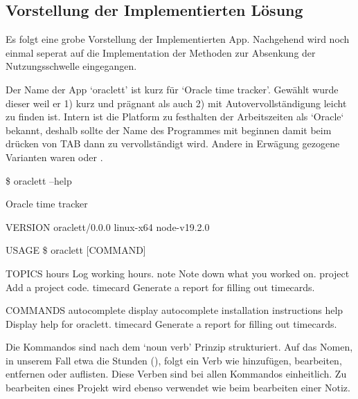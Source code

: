 \documentclass[oneside,bibliography=totocnumbered,BCOR=5mm]{scrbook}
\newenvironment{code}{\captionsetup{type=listing, skip=0pt}}{}
\begin{document}
\subsection{Vorstellung der Implementierten Lösung}


Es folgt eine grobe Vorstellung der Implementierten App. Nachgehend wird
noch einmal seperat auf die Implementation der Methoden zur Absenkung der
Nutzungsschwelle eingegangen.

\medskip

Der Name der App `oraclett' ist kurz für `Oracle time tracker'. Gewählt wurde
dieser weil er 1) kurz und prägnant als auch 2) mit Autovervollständigung leicht
zu finden ist. Intern ist die Platform zu festhalten der Arbeitszeiten als
`Oracle` bekannt, deshalb sollte der Name des Programmes mit 
beginnen damit beim drücken von TAB dann zu 
vervollständigt wird. Andere in Erwägung gezogene Varianten waren
 oder .

\begin{code}
  \medskip
  \label{code:oraclett-help}
  \begin{shellcode}
  \$ oraclett --help

  Oracle time tracker

  VERSION
    oraclett/0.0.0 linux-x64 node-v19.2.0

  USAGE
    \$ oraclett [COMMAND]

  TOPICS
    hours     Log working hours.
    note      Note down what you worked on.
    project   Add a project code.
    timecard  Generate a report for filling out timecards.

  COMMANDS
    autocomplete  display autocomplete installation instructions
    help          Display help for oraclett.
    timecard      Generate a report for filling out timecards.
  \end{shellcode}
\end{code}

Die Kommandos sind nach dem `noun verb' Prinzip \parencite{clig} strukturiert.
Auf das Nomen, in unserem Fall etwa die Stunden (), folgt
ein Verb wie hinzufügen, bearbeiten, entfernen oder auflisten. Diese Verben
sind bei allen Kommandos einheitlich. Zu bearbeiten eines Projekt wird ebenso
 verwendet wie beim bearbeiten einer Notiz.
\end{document}
